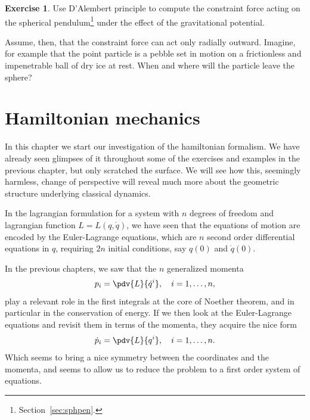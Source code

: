 \documentclass[english,fontsize=11pt,paper=b5]{scrbook}
\theoremstyle{definition}
\newtheorem{exercise}{Exercise}[chapter]
\begin{document}
    \begin{exercise}
      Use D'Alembert principle to compute the constraint force acting on the spherical pendulum\footnote{Section~\ref{sec:sphpen}.} under the effect of the gravitational potential.

      Assume, then, that the constraint force can act only radially outward. Imagine, for example that the point particle is a pebble set in motion on a frictionless and impenetrable ball of dry ice at rest.
      When and where will the particle leave the sphere?
    \end{exercise}


    \chapter{Hamiltonian mechanics}

    In this chapter we start our investigation of the hamiltonian formalism.
    We have already seen glimpses of it throughout some of the exercises and examples in the previous chapter, but only scratched the surface.
    We will see how this, seemingly harmless, change of perspective will reveal much more about the geometric structure underlying classical dynamics.

    In the lagrangian formulation for a system with $n$ degrees of freedom and lagrangian function $L=L(q, \dot q)$, we have seen that the equations of motion are encoded by the Euler-Lagrange equations, which are $n$ second order differential equations in $q$, requiring $2n$ initial conditions, say $q(0)$ and $\dot q(0)$.

    In the previous chapters, we saw that the $n$ generalized momenta
    \begin{equation}
      p_i = \pdv{L}{\dot q^i}, \quad i=1,\ldots,n,
    \end{equation}
    play a relevant role in the first integrals at the core of Noether theorem, and in particular in the conservation of energy.
    If we then look at the Euler-Lagrange equations and revisit them in terms of the momenta, they acquire the nice form
    \begin{equation}
      \dot p_i = \pdv{L}{q^i}, \quad i=1,\ldots,n.
    \end{equation}
    Which seems to bring a nice symmetry between the coordinates and the momenta, and seems to allow us to reduce the problem to a first order system of equations.
\end{document}
